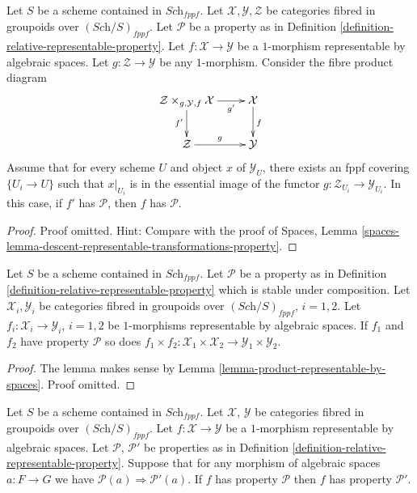 \begin{lemma}
\label{lemma-descent-representable-transformations-property}
Let $S$ be a scheme contained in $\textit{Sch}_{fppf}$.
Let $\mathcal{X}, \mathcal{Y}, \mathcal{Z}$
be categories fibred in groupoids over $(\textit{Sch}/S)_{fppf}$.
Let $\mathcal{P}$ be a property as in
Definition \ref{definition-relative-representable-property}.
Let $f : \mathcal{X} \to \mathcal{Y}$ be a $1$-morphism
representable by algebraic spaces.
Let $g : \mathcal{Z} \to \mathcal{Y}$ be any $1$-morphism.
Consider the fibre product diagram
$$
\xymatrix{
\mathcal{Z} \times_{g, \mathcal{Y}, f} \mathcal{X} \ar[r]_-{g'} \ar[d]_{f'} &
\mathcal{X} \ar[d]^f \\
\mathcal{Z} \ar[r]^g & \mathcal{Y}
}
$$
Assume that for every scheme $U$ and object $x$ of $\mathcal{Y}_U$,
there exists an fppf covering $\{U_i \to U\}$ such that $x|_{U_i}$
is in the essential image of the functor
$g : \mathcal{Z}_{U_i} \to \mathcal{Y}_{U_i}$.
In this case, if $f'$ has $\mathcal{P}$, then $f$ has $\mathcal{P}$.
\end{lemma}

\begin{proof}
Proof omitted. Hint: Compare with the proof of
Spaces,
Lemma \ref{spaces-lemma-descent-representable-transformations-property}.
\end{proof}

\begin{lemma}
\label{lemma-product-representable-transformations-property}
Let $S$ be a scheme contained in $\textit{Sch}_{fppf}$.
Let $\mathcal{P}$ be a property as in
Definition \ref{definition-relative-representable-property}
which is stable under composition.
Let $\mathcal{X}_i, \mathcal{Y}_i$ be categories fibred in groupoids over
$(\textit{Sch}/S)_{fppf}$, $i = 1, 2$.
Let $f_i : \mathcal{X}_i \to \mathcal{Y}_i$, $i = 1, 2$
be $1$-morphisms representable by algebraic spaces.
If $f_1$ and $f_2$ have property $\mathcal{P}$ so does
$
f_1 \times f_2 :
\mathcal{X}_1 \times \mathcal{X}_2
\to
\mathcal{Y}_1 \times \mathcal{Y}_2
$.
\end{lemma}

\begin{proof}
The lemma makes sense by
Lemma \ref{lemma-product-representable-by-spaces}.
Proof omitted.
\end{proof}

\begin{lemma}
\label{lemma-representable-transformations-property-implication}
Let $S$ be a scheme contained in $\textit{Sch}_{fppf}$.
Let $\mathcal{X}$, $\mathcal{Y}$ be categories fibred in groupoids
over $(\textit{Sch}/S)_{fppf}$.
Let $f : \mathcal{X} \to \mathcal{Y}$ be a $1$-morphism representable
by algebraic spaces.
Let $\mathcal{P}$, $\mathcal{P}'$ be properties as in
Definition \ref{definition-relative-representable-property}.
Suppose that for any morphism of algebraic spaces $a : F \to G$
we have $\mathcal{P}(a) \Rightarrow \mathcal{P}'(a)$.
If $f$ has property $\mathcal{P}$ then
$f$ has property $\mathcal{P}'$.
\end{lemma}

